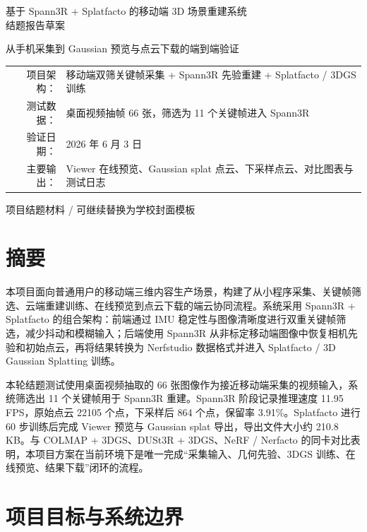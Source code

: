 ﻿\documentclass[12pt]{article}
\begin{document}
\begin{titlepage}
\centering
\vspace*{2.4cm}
{\heiti\fontsize{22pt}{28pt}\selectfont 基于 Spann3R + Splatfacto 的移动端 3D 场景重建系统\\[0.35em]结题报告草案\par}
\vspace{1.0cm}
{\large 从手机采集到 Gaussian 预览与点云下载的端到端验证\par}
\vspace{1.6cm}
\begin{tabular}{rl}
项目架构：& 移动端双筛关键帧采集 + Spann3R 先验重建 + Splatfacto / 3DGS 训练 \\
测试数据：& 桌面视频抽帧 66 张，筛选为 11 个关键帧进入 Spann3R \\
验证日期：& 2026 年 6 月 3 日 \\
主要输出：& Viewer 在线预览、Gaussian splat 点云、下采样点云、对比图表与测试日志 \\
\end{tabular}
\vfill
{\large 项目结题材料 / 可继续替换为学校封面模板\par}
\end{titlepage}

\tableofcontents
\newpage

\section{摘要}
本项目面向普通用户的移动端三维内容生产场景，构建了从小程序采集、关键帧筛选、云端重建训练、在线预览到点云下载的端云协同流程。系统采用 Spann3R + Splatfacto 的组合架构：前端通过 IMU 稳定性与图像清晰度进行双重关键帧筛选，减少抖动和模糊输入；后端使用 Spann3R 从非标定移动端图像中恢复相机先验和初始点云，再将结果转换为 Nerfstudio 数据格式并进入 Splatfacto / 3D Gaussian Splatting 训练。

本轮结题测试使用桌面视频抽取的 66 张图像作为接近移动端采集的视频输入，系统筛选出 11 个关键帧用于 Spann3R 重建。Spann3R 阶段记录推理速度 11.95 FPS，原始点云 22105 个点，下采样后 864 个点，保留率 3.91\%。Splatfacto 进行 60 步训练后完成 Viewer 预览与 Gaussian splat 导出，导出文件大小约 210.8 KB。与 COLMAP + 3DGS、DUSt3R + 3DGS、NeRF / Nerfacto 的同卡对比表明，本项目方案在当前环境下是唯一完成“采集输入、几何先验、3DGS 训练、在线预览、结果下载”闭环的流程。

\section{项目目标与系统边界}
\end{document}
